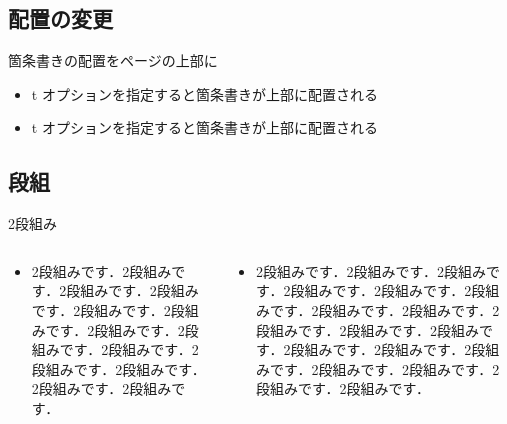 \subsection{配置の変更}

\begin{frame}[t]{箇条書きの配置をページの上部に}
  \begin{itemize}
    \item t オプションを指定すると箇条書きが上部に配置される
    \item t オプションを指定すると箇条書きが上部に配置される
  \end{itemize}
\end{frame}

\subsection{段組}

\begin{frame}{2段組み}
  \begin{columns}
    \begin{column}{0.5\textwidth}
      \begin{itemize}
        \item 2段組みです．2段組みです．2段組みです．2段組みです．2段組みです．2段組みです．2段組みです．2段組みです．2段組みです．2段組みです．2段組みです．2段組みです．2段組みです．
      \end{itemize}
    \end{column}
    \begin{column}{0.5\textwidth}
      \begin{itemize}
        \item 2段組みです．2段組みです．2段組みです．2段組みです．2段組みです．2段組みです．2段組みです．2段組みです．2段組みです．2段組みです．2段組みです．2段組みです．2段組みです．2段組みです．2段組みです．2段組みです．2段組みです．2段組みです．
      \end{itemize}
    \end{column}
  \end{columns}
\end{frame}

